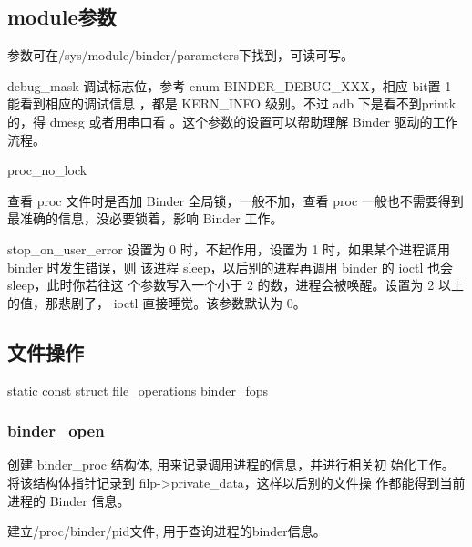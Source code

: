 \documentclass[a4paper,11pt]{article}
\begin{document}
\subsection{module参数} 
参数可在/sys/module/binder/parameters下找到，可读可写。
\begin{itemize*}
    \item debug_mask
    调试标志位，参考 enum BINDER_DEBUG_XXX，相应 bit置 1 能看到相应的调试信息
    ，都是 KERN_INFO 级别。不过 adb 下是看不到printk 的，得 dmesg 或者用串口看
    。这个参数的设置可以帮助理解 Binder 驱动的工作流程。

    \item proc_no_lock

    查看 proc 文件时是否加 Binder 全局锁，一般不加，查看 proc 一般也不需要得到
    最准确的信息，没必要锁着，影响 Binder 工作。

    \item stop_on_user_error \label{paramstop}
    设置为 0 时，不起作用，设置为 1 时，如果某个进程调用 binder 时发生错误，则
    该进程 sleep，以后别的进程再调用 binder 的 ioctl 也会 sleep，此时你若往这
    个参数写入一个小于 2 的数，进程会被唤醒。设置为 2 以上的值，那悲剧了，
    ioctl 直接睡觉。该参数默认为 0。
\end{itemize*}

\subsection{文件操作}
static const struct file_operations binder_fops

\subsubsection{binder_open} 
\begin{itemize*}
    \item 创建 binder_proc 结构体, 用来记录调用进程的信息，并进行相关初
        始化工作。将该结构体指针记录到 filp->private_data，这样以后别的文件操
        作都能得到当前进程的 Binder 信息。
    \item 建立/proc/binder/pid文件, 用于查询进程的binder信息。
\end{itemize*}
\end{document}
